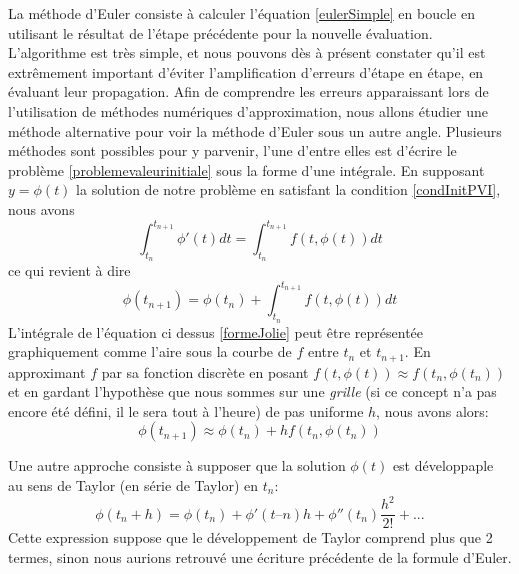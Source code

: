 \documentclass[12pt]{article}
\begin{document}
La méthode d'Euler consiste à calculer l'équation \eqref{eulerSimple} en boucle en utilisant le résultat de l'étape précédente pour la nouvelle évaluation. L'algorithme est très simple, et nous pouvons dès à présent constater qu'il est extrêmement important d'éviter l'amplification d'erreurs d'étape en étape, en évaluant leur propagation.
Afin de comprendre les erreurs apparaissant lors de l'utilisation de méthodes numériques d'approximation, nous allons étudier une méthode alternative pour voir la méthode d'Euler sous un autre angle.
Plusieurs méthodes sont possibles pour y parvenir, l'une d'entre elles est d'écrire le problème \eqref{problemevaleurinitiale} sous la forme d'une intégrale. En supposant $y = \phi(t)$ la solution de notre problème en satisfant la condition \eqref{condInitPVI}, nous avons
\begin{equation}
\int_{t_n}^{t_{n+1}} \phi ' (t) dt = \int_{t_n}^{t_{n+1}} f(t, \phi(t)) dt
\end{equation}
ce qui revient à dire 
\begin{equation} \label{formeJolie}
\phi(t_{n+1}) = \phi(t_n) + \int_{t_n}^{t_{n+1}} f(t, \phi(t)) dt
\end{equation}
L'intégrale de l'équation ci dessus \eqref{formeJolie} peut être représentée graphiquement comme l'aire sous la courbe de $f$ entre $t_n$ et $t_{n+1}$. En approximant $f$ par sa fonction discrète en posant $f(t, \phi(t)) \approx f(t_n, \phi(t_n))$ et en gardant l'hypothèse que nous sommes sur une \emph{grille} (si ce concept n'a pas encore été défini, il le sera tout à l'heure) de pas uniforme $h$, nous avons alors:
\begin{equation}
\phi(t_{n+1}) \approx \phi(t_n) + hf(t_n, \phi(t_n))
\end{equation}

\quad Une autre approche consiste à supposer que la solution $\phi(t)$ est développaple au sens de Taylor (en série de Taylor) en $t_n$:
\begin{equation}
\phi (t_n + h) = \phi (t_n) + \phi'(t–n)h + \phi''(t_n) \frac{h^2}{2!} + ...
\end{equation}
Cette expression suppose que le développement de Taylor comprend plus que 2 termes, sinon nous aurions retrouvé une écriture précédente de la formule d'Euler.
\end{document}
